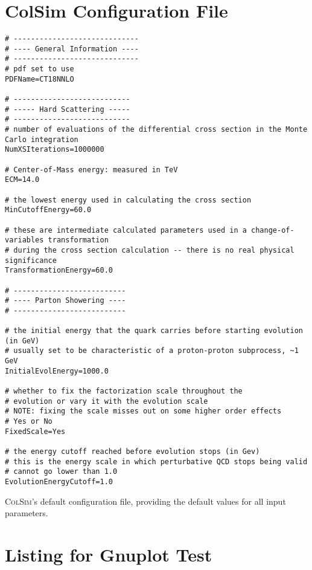 \section{ColSim Configuration File}\label{sec:colsim-config-file}

\begin{listing}[ht!]
\begin{verbatim}
# -----------------------------
# ---- General Information ----
# -----------------------------
# pdf set to use
PDFName=CT18NNLO

# ---------------------------
# ----- Hard Scattering -----
# ---------------------------
# number of evaluations of the differential cross section in the Monte Carlo integration
NumXSIterations=1000000

# Center-of-Mass energy: measured in TeV
ECM=14.0

# the lowest energy used in calculating the cross section
MinCutoffEnergy=60.0

# these are intermediate calculated parameters used in a change-of-variables transformation
# during the cross section calculation -- there is no real physical significance
TransformationEnergy=60.0

# --------------------------
# ---- Parton Showering ----
# --------------------------

# the initial energy that the quark carries before starting evolution (in GeV)
# usually set to be characteristic of a proton-proton subprocess, ~1 GeV
InitialEvolEnergy=1000.0

# whether to fix the factorization scale throughout the
# evolution or vary it with the evolution scale
# NOTE: fixing the scale misses out on some higher order effects
# Yes or No
FixedScale=Yes

# the energy cutoff reached before evolution stops (in Gev)
# this is the energy scale in which perturbative QCD stops being valid
# cannot go lower than 1.0
EvolutionEnergyCutoff=1.0
\end{verbatim}
\caption{\textsc{ColSim}'s default configuration file, providing the default values for all input parameters.}
\label{listing:colsim-config-file}
\end{listing}



\pagebreak

\section{Listing for Gnuplot Test}\label{sec:gnuplot-listing}

